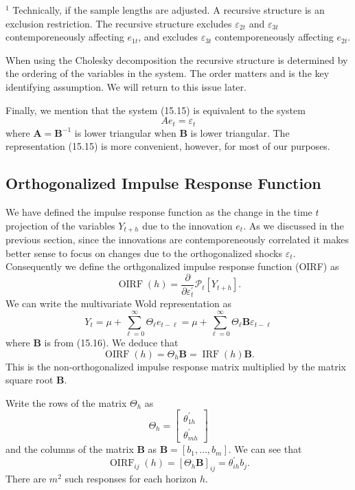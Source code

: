 \documentclass[10pt]{article}
\begin{document}
${ }^{1}$ Technically, if the sample lengths are adjusted. A recursive structure is an exclusion restriction. The recursive structure excludes $\varepsilon_{2 t}$ and $\varepsilon_{3 t}$ contemporeneously affecting $e_{1 t}$, and excludes $\varepsilon_{3 t}$ contemporeneously affecting $e_{2 t}$.

When using the Cholesky decomposition the recursive structure is determined by the ordering of the variables in the system. The order matters and is the key identifying assumption. We will return to this issue later.

Finally, we mention that the system (15.15) is equivalent to the system
$$
A e_{t}=\varepsilon_{t}
$$
where $\boldsymbol{A}=\boldsymbol{B}^{-1}$ is lower triangular when $\boldsymbol{B}$ is lower triangular. The representation (15.15) is more convenient, however, for most of our purposes.

\subsection{Orthogonalized Impulse Response Function}
We have defined the impulse response function as the change in the time $t$ projection of the variables $Y_{t+h}$ due to the innovation $e_{t}$. As we discussed in the previous section, since the innovations are contemporeneously correlated it makes better sense to focus on changes due to the orthogonalized shocks $\varepsilon_{t}$. Consequently we define the orthgonalized impulse response function (OIRF) as
$$
\operatorname{OIRF}(h)=\frac{\partial}{\partial \varepsilon_{t}^{\prime}} \mathscr{P}_{t}\left[Y_{t+h}\right] .
$$
We can write the multivariate Wold representation as
$$
Y_{t}=\mu+\sum_{\ell=0}^{\infty} \Theta_{\ell} e_{t-\ell}=\mu+\sum_{\ell=0}^{\infty} \Theta_{\ell} \boldsymbol{B} \varepsilon_{t-\ell}
$$
where $\boldsymbol{B}$ is from (15.16). We deduce that
$$
\operatorname{OIRF}(h)=\Theta_{h} \boldsymbol{B}=\operatorname{IRF}(h) \boldsymbol{B} .
$$
This is the non-orthogonalized impulse response matrix multiplied by the matrix square root $\boldsymbol{B}$.

Write the rows of the matrix $\Theta_{h}$ as
$$
\Theta_{h}=\left[\begin{array}{c}
\theta_{1 h}^{\prime} \\
\theta_{m h}^{\prime}
\end{array}\right]
$$
and the columns of the matrix $\boldsymbol{B}$ as $\boldsymbol{B}=\left[b_{1}, \ldots, b_{m}\right]$. We can see that
$$
\operatorname{OIRF}_{i j}(h)=\left[\Theta_{h} \boldsymbol{B}\right]_{i j}=\theta_{i h}^{\prime} b_{j} .
$$
There are $m^{2}$ such responses for each horizon $h$.
\end{document}
